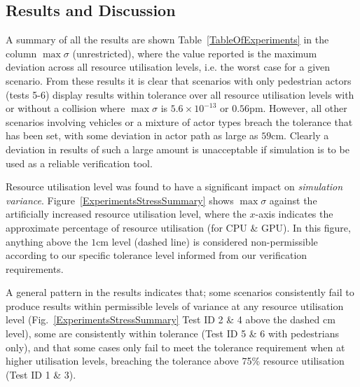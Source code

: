 \documentclass[letterpaper, 10 pt, journal, twoside]{IEEEtran}
\begin{document}
\subsection{Results and Discussion}\label{ResultsSection}
A summary of all the results are shown Table~\ref{TableOfExperiments} in the column $\max\sigma$ (unrestricted), where the value reported is the maximum deviation across all resource utilisation levels, i.e. the worst case for a given scenario.  
%
From these  results it is clear that scenarios with only pedestrian actors (tests 5-6) display results within tolerance over all resource utilisation levels with or without a collision where $\max\sigma$ is $5.6\times10^{-13}$ or $0.56\si{\pico\metre}$. However, all other scenarios involving vehicles or a mixture of actor types breach the tolerance that has been set, with some deviation in actor path as large as $59$cm.
%
Clearly a deviation in results of such a large amount is unacceptable if simulation is to be used as a reliable verification tool.

Resource utilisation level was found to have a significant impact on \textit{simulation variance}.
%
Figure~\ref{ExperimentsStressSummary} shows $\max\sigma$ against the artificially increased resource utilisation level, where the $x$-axis indicates the approximate percentage of resource utilisation (for CPU \& GPU). In this figure, anything above the $1$cm level (dashed line) is considered non-permissible according to our specific tolerance level informed from our verification requirements.
%
%

A general pattern in the results indicates that; some scenarios consistently fail to produce results within permissible levels of variance at any resource utilisation level (Fig.~\ref{ExperimentsStressSummary} Test ID 2 \& 4 above the dashed cm level), some are consistently within tolerance (Test ID 5 \& 6 with pedestrians only), and that some cases only fail to meet the tolerance requirement when at higher utilisation levels, breaching the tolerance above 75\% resource utilisation (Test ID 1 \& 3).
\end{document}
